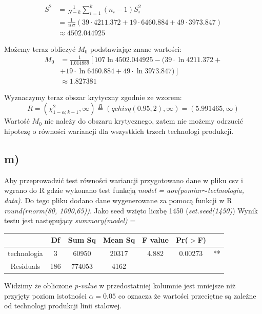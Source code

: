 \documentclass{article}
\begin{document}
\begin{align*}
S^2 & = \frac{1}{N-k} \sum_{i=1}^k (n_i - 1) S_i^2 \\
& = \frac{1}{107} ( 39 \cdot 4211.372 + 19 \cdot 6460.884 + 49 \cdot 3973.847) \\
& \approx 4502.044925
\end{align*}

Możemy teraz obliczyć $M_0$ podstawiając znane wartości:
\begin{align*}
M_0 & = \frac{1}{1.014889} \left[ 107 \ln{4502.044925} - ( 39 \cdot \ln{4211.372} + \right. \\
& \left. + 19 \cdot \ln{6460.884} + 49 \cdot \ln{3973.847}) \right] \\
& \approx 1.827381
\end{align*}

Wyznaczymy teraz obszar krytyczny zgodnie ze wzorem:
\[ R = (\chi^2_{1-\alpha;k-1}, \infty) \overset{R}{=} (qchisq(0.95, 2), \infty) = (5.991465, \infty) \]
Wartość $M_0$ nie należy do obszaru krytycznego, zatem nie możemy odrzucić hipotezę o równości wariancji dla wszystkich trzech technologi produkcji.

\subsection{m)}
Aby przeprowadzić test równości wariancji przygotowano dane w pliku csv i wgrano do R gdzie wykonano test funkcją \textit{model = aov(pomiar$\sim$technologia, data)}. Do tego pliku dodano dane wygenerowane za pomocą funkcji w R \textit{round(rnorm(80, 1000,65))}. Jako seed wzięto liczbę 1450 (\textit{set.seed(1450)}) Wynik testu jest następujący \textit{summary(model)} = 
\begin{center} \begin{tabular}{|c|c|c|c|c|c|c|} \hline
 & Df & Sum Sq & Mean Sq & F value & Pr($>$F) & \\ \hline
technologia & 3 & 60950 & 20317 & 4.882 & 0.00273 & ** \\ \hline
Residuals & 186 & 774053 & 4162 & & & \\ \hline
\end{tabular} \end{center}
Widzimy że obliczone \textit{p-value} w przedostatniej kolumnie jest mniejsze niż przyjęty poziom istotności $\alpha = 0.05$ co oznacza że wartości przeciętne są zależne od technologi produkcji linii stalowej. \\
\end{document}

